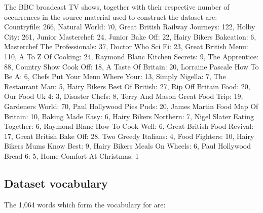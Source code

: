The BBC broadcast TV shows, together with their respective number of occurrences in the source material used to construct the dataset are: \\

\noindent Countryfile: 266, Natural World: 70, Great British Railway Journeys: 122, Holby City: 261, Junior Masterchef: 24, Junior Bake Off: 22, Hairy Bikers Bakeation: 6, Masterchef The Professionals: 37, Doctor Who Sci Fi: 23, Great British Menu: 110, A To Z Of Cooking: 24, Raymond Blanc Kitchen Secrets: 9, The Apprentice: 88, Country Show Cook Off: 18, A Taste Of Britain: 20, Lorraine Pascale How To Be A: 6, Chefs Put Your Menu Where Your: 13, Simply Nigella: 7, The Restaurant Man: 5, Hairy Bikers Best Of British: 27, Rip Off Britain Food: 20, Our Food Uk 4: 3, Disaster Chefs: 8, Terry And Mason Great Food Trip: 19, Gardeners World: 70, Paul Hollywood Pies Puds: 20, James Martin Food Map Of Britain: 10, Baking Made Easy: 6, Hairy Bikers Northern: 7, Nigel Slater Eating Together: 6, Raymond Blanc How To Cook Well: 6, Great British Food Revival: 17, Great British Bake Off: 28, Two Greedy Italians: 4, Food Fighters: 10, Hairy Bikers Mums Know Best: 9, Hairy Bikers Meals On Wheels: 6, Paul Hollywood Bread 6: 5, Home Comfort At Christmas: 1 \subsection{Dataset vocabulary} \label{app:subsec:vocab}

The 1,064 words which form the vocabulary for \datasetName{} are:\\

